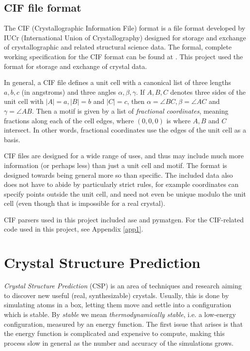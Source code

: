 \documentclass[11pt]{article}
\theoremstyle{definition}
\begin{document}
\subsection{CIF file format}

The CIF (Crystallographic Information File) format is a file format developed by IUCr (International Union of Crystallography) designed for storage and exchange of crystallographic and related structural science data. The formal, complete working specification for the CIF format can be found at \cite{CIF}. This project used the format for storage and exchange of crystal data. 

In general, a CIF file defines a unit cell with a canonical list of three lengths $a,b,c$ (in angstroms) and three angles $\alpha,\beta,\gamma$. If $A,B,C$ denotes three sides of the unit cell with $|A|=a, |B|=b$ and $|C|=c$, then $\alpha = \angle BC, \beta = \angle AC$ and $\gamma = \angle AB$. Then a motif is given by a list of \emph{fractional coordinates}, meaning fractions along each of the cell edges, where $(0,0,0)$ is where $A,B$ and $C$ intersect. In other words, fractional coordinates use the edges of the unit cell as a basis. 

CIF files are designed for a wide range of uses, and thus may include much more information (or perhaps less) than just a unit cell and motif. The format is designed towards being general more so than specific. The included data also does not have to abide by particularly strict rules, for example coordinates can specify points outside the unit cell, and need not even be unique modulo the unit cell (even though that is impossible for a real crystal).

CIF parsers used in this project included ase and pymatgen. For the CIF-related code used in this project, see Appendix \ref{app1}.

\section{Crystal Structure Prediction}\label{csp-problem}

\emph{Crystal Structure Prediction} (CSP) is an area of techniques and research aiming to discover new useful (real, synthesizable) crystals. Usually, this is done by simulating atoms in a box, letting them move and settle into a configuration which is stable. By \emph{stable} we mean \emph{thermodynamically stable}, i.e. a low-energy configuration, measured by an energy function. The first issue that arises is that the energy function is complicated and expensive to compute, making this process slow in general as the number and accuracy of the simulations grows.
\end{document}
